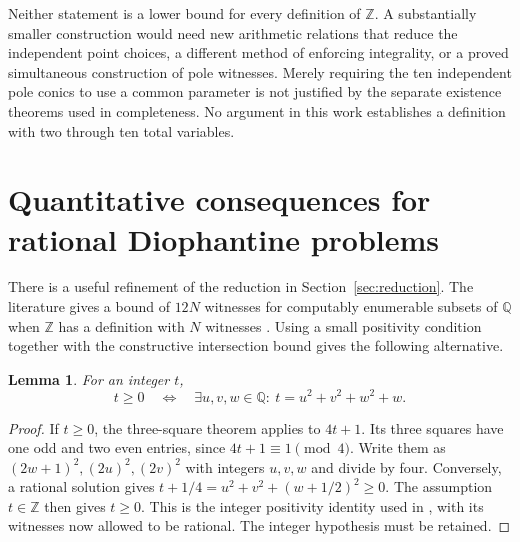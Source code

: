 \documentclass[11pt]{article}
\newtheorem{lemma}[theorem]{Lemma}
\theoremstyle{definition}
\newcommand{\Q}{\mathbb Q}
\newcommand{\Z}{\mathbb Z}
\begin{document}
Neither statement is a lower bound for every definition of
$\mathbb Z$.  A substantially smaller construction would need new
arithmetic relations that reduce the independent point choices, a
different method of enforcing integrality, or a proved simultaneous
construction of pole witnesses.  Merely requiring the ten independent
pole conics to use a common parameter is not justified by the separate
existence theorems used in completeness.  No argument in this work
establishes a definition with two through ten total variables.


\section{Quantitative consequences for rational Diophantine problems}
\label{subsec:quantitative-mrdp}

There is a useful refinement of the reduction in
Section~\ref{sec:reduction}. The literature gives a bound of $12N$
witnesses for computably enumerable subsets of $\Q$ when $\Z$ has
a definition with $N$ witnesses \cite[Remark 8.23]{DDF2025}.
Using a small positivity condition together with the constructive
intersection bound gives the following alternative.

\begin{lemma}\label{lem:integer-positivity-rational}
For an integer $t$,
\[
 t\ge0\quad\Longleftrightarrow\quad
 \exists u,v,w\in\Q:\ t=u^2+v^2+w^2+w.
\]
\end{lemma}
\begin{proof}
If $t\ge0$, the three-square theorem applies to $4t+1$.
Its three squares have one odd and two even entries, since
$4t+1\equiv1\pmod4$. Write them as $(2w+1)^2,(2u)^2,(2v)^2$
with integers $u,v,w$ and divide by four. Conversely, a rational
solution gives
$t+1/4=u^2+v^2+(w+1/2)^2\ge0$. The assumption $t\in\Z$
then gives $t\ge0$. This is the integer positivity identity used
in \cite[Equation (1.1)]{Sun2021}, with its witnesses now allowed
to be rational. The integer hypothesis must be retained.
\end{proof}
\end{document}
